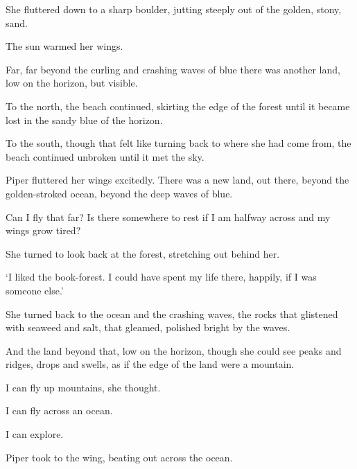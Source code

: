 She fluttered down to a sharp boulder, jutting steeply out of the
golden, stony, sand.

The sun warmed her wings.

Far, far beyond the curling and crashing waves of blue there was
another land, low on the horizon, but visible.

To the north, the beach continued, skirting the edge of the forest
until it became lost in the sandy blue of the horizon.

To the south, though that felt like turning back to where she had come
from, the beach continued unbroken until it met the sky.

Piper fluttered her wings excitedly. There was a new land, out there,
beyond the golden-stroked ocean, beyond the deep waves of blue.

Can I fly that far? Is there somewhere to rest if I am halfway across
and my wings grow tired?

She turned to look back at the forest, stretching out behind her.

`I liked the book-forest. I could have spent my life there, happily,
if I was someone else.'

She turned back to the ocean and the crashing waves, the rocks that
glistened with seaweed and salt, that gleamed, polished bright by the
waves.

And the land beyond that, low on the horizon, though she could see
peaks and ridges, drops and swells, as if the edge of the land were a
mountain.

I can fly up mountains, she thought.

I can fly across an ocean.

I can explore.

Piper took to the wing, beating out across the ocean.


